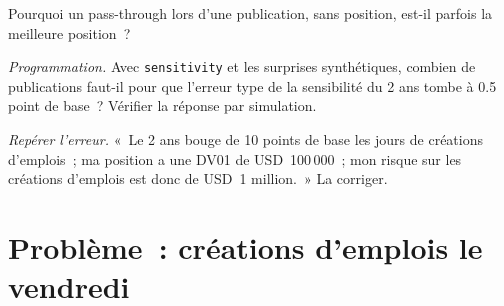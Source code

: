 \begin{exercise}[$\star\star$]\label{exo:m2:reading-a-macro-calendar-and-a-rates-screen:6}
Pourquoi un pass-through lors d'une publication, sans position, est-il parfois la meilleure position~?
\end{exercise}

\begin{exercise}[$\star\star\star$]\label{exo:m2:reading-a-macro-calendar-and-a-rates-screen:7}
\emph{Programmation.} Avec \texttt{sensitivity} et les surprises synthétiques, combien de publications
faut-il pour que l'erreur type de la sensibilité du 2 ans tombe à 0.5 point de base~?
Vérifier la réponse par simulation.
\end{exercise}

\begin{exercise}[$\star\star\star$]\label{exo:m2:reading-a-macro-calendar-and-a-rates-screen:8}
\emph{Repérer l'erreur.} «~Le 2 ans bouge de 10 points de base les jours de créations d'emplois~; ma position a une
DV01 de USD~100\,000~; mon risque sur les créations d'emplois est donc de USD~1 million.~» La corriger.
\end{exercise}

\section{Problème~: créations d'emplois le vendredi}

